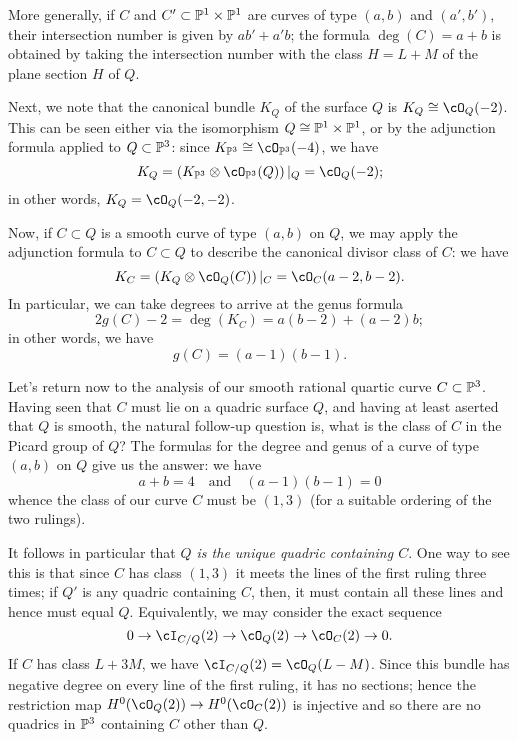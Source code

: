 More generally, if $C$ and $C' \subset \PP^1 \times \PP^1$ are curves of type $(a,b)$ and $(a',b')$, their intersection number is given by $ab' + a'b$; the formula $\deg(C) = a+b$ is obtained by taking the intersection number with the class $H = L + M$ of the plane section $H$ of $Q$.

Next, we note that the canonical bundle $K_Q$ of the surface $Q$ is $K_Q \cong \cO_Q(-2)$. This can be seen either via the isomorphism $Q \cong \PP^1 \times \PP^1$, or by the adjunction formula applied to $Q \subset \PP^3$: since $K_{\PP^3} \cong \cO_{\PP^3}(-4)$, we have
$$
K_Q = \left(K_{\PP^3} \otimes \cO_{\PP^3}(Q) \right) |_Q = \cO_Q(-2);
$$
in other words, $K_Q = \cO_Q(-2,-2)$.

Now, if $C \subset Q$ is a smooth curve of type $(a,b)$ on $Q$, we may apply the adjunction formula to $C \subset Q$ to describe the canonical divisor class of $C$: we have
$$
K_C = \left(K_{Q} \otimes \cO_{Q}(C) \right) |_C = \cO_C(a-2,b-2).
$$
In particular, we can take degrees to arrive at the genus formula
$$
2g(C) - 2 = \deg(K_C) = a(b-2) + (a-2)b;
$$
in other words, we have
$$
g(C) = (a-1)(b-1).
$$

Let's return now to the analysis of our smooth rational quartic curve $C \subset \PP^3$. Having seen that $C$ must lie on a quadric surface $Q$, and having at least aserted that $Q$ is smooth, the natural follow-up question is, what is the class of $C$ in the Picard group of $Q$? The formulas for the degree and genus of a curve of type $(a,b)$ on $Q$ give us the answer: we have
$$
 a+b = 4 \quad \text{and} \quad (a-1)(b-1) = 0
$$
whence the class of our curve $C$ must be $(1,3)$ (for a suitable ordering of the two rulings).

It follows in particular that \emph{$Q$ is the unique quadric containing $C$}. One way to see this is that since $C$ has class $(1,3)$ it meets the lines of the first ruling three times; if $Q'$ is any quadric containing $C$, then, it must contain all these lines and hence must equal $Q$. Equivalently, we may consider the exact sequence
$$
0 \to \cI_{C/Q}(2) \to \cO_Q(2)  \to \cO_C(2) \to 0.
$$
If $C$ has class $L+3M$, we have $\cI_{C/Q}(2) = \cO_{Q}(L-M)$. Since this bundle has negative degree on every line of the first ruling, it has no sections; hence the restriction map $H^0(\cO_Q(2))  \to H^0(\cO_C(2))$ is injective and so there are no  quadrics in $\PP^3$ containing $C$ other than $Q$.

